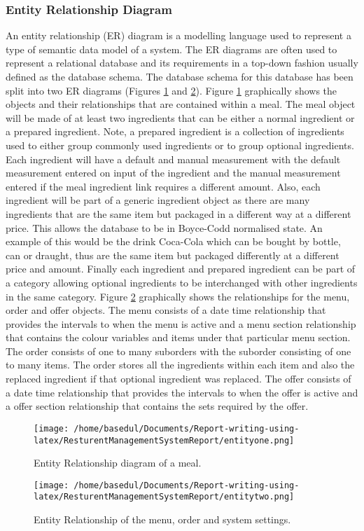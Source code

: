 \documentclass[12pt,a4paper]{article}
\begin{document}
\subsubsection{Entity Relationship Diagram}
	\label{sec:entity}
An entity relationship (ER) diagram is a modelling language used to represent a type of semantic
data model of a system. The ER diagrams are often used to represent a relational database and its
requirements in a top-down fashion usually defined as the database schema. The database schema for
this database has been split into two ER diagrams (Figures \ref{fig:entityone} and \ref{fig:entitytwo}).
Figure \ref{fig:entityone} graphically shows the objects and their relationships that are contained within a meal.
The meal object will be made of at least two ingredients that can be either a normal ingredient or
a prepared ingredient. Note, a prepared ingredient is a collection of ingredients used to either group
commonly used ingredients or to group optional ingredients. Each ingredient will have a default and
manual measurement with the default measurement entered on input of the ingredient and the manual
measurement entered if the meal ingredient link requires a different amount.
Also, each ingredient will be part of a generic ingredient object as there are many ingredients that
are the same item but packaged in a different way at a different price. This allows the database to be in
Boyce-Codd normalised state. An example of this would be the drink Coca-Cola which can be bought
by bottle, can or draught, thus are the same item but packaged differently at a different price and
amount. Finally each ingredient and prepared ingredient can be part of a category allowing optional
ingredients to be interchanged with other ingredients in the same category.
Figure \ref{fig:entitytwo} graphically shows the relationships for the menu, order and offer objects. The menu
consists of a date time relationship that provides the intervals to when the menu is active and a menu
section relationship that contains the colour variables and items under that particular menu section.
The order consists of one to many suborders with the suborder consisting of one to many items.
The order stores all the ingredients within each item and also the replaced ingredient if that optional
ingredient was replaced.
The offer consists of a date time relationship that provides the intervals to when the offer is active
and a offer section relationship that contains the sets required by the offer.
\begin{figure}[H]
		\centering
		\texttt{[image: /home/basedul/Documents/Report-writing-using-latex/ResturentManagementSystemReport/entityone.png]}
		\caption{Entity Relationship diagram of a meal.}
		\label{fig:entityone} 
	\end{figure}
\begin{figure}[H]
		\centering
		\texttt{[image: /home/basedul/Documents/Report-writing-using-latex/ResturentManagementSystemReport/entitytwo.png]}
		\caption{Entity Relationship of the menu, order and system settings.}
		\label{fig:entitytwo} 
	\end{figure}
	
\end{document}

